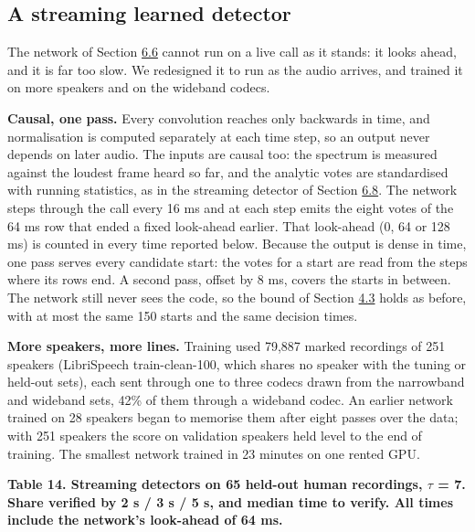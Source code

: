 \documentclass[10pt,a4paper]{article}
\begin{document}
\subsection{A streaming learned detector}\label{s-6-13}

The network of Section \hyperref[s-6-6]{6.6} cannot run on a live call as it stands: it looks ahead, and it is far too slow. We redesigned it to run as the audio arrives, and trained it on more speakers and on the wideband codecs.

\textbf{Causal, one pass.} Every convolution reaches only backwards in time, and normalisation is computed separately at each time step, so an output never depends on later audio. The inputs are causal too: the spectrum is measured against the loudest frame heard so far, and the analytic votes are standardised with running statistics, as in the streaming detector of Section \hyperref[s-6-8]{6.8}. The network steps through the call every 16 ms and at each step emits the eight votes of the 64 ms row that ended a fixed look-ahead earlier. That look-ahead (0, 64 or 128 ms) is counted in every time reported below. Because the output is dense in time, one pass serves every candidate start: the votes for a start are read from the steps where its rows end. A second pass, offset by 8 ms, covers the starts in between. The network still never sees the code, so the bound of Section \hyperref[s-4-3]{4.3} holds as before, with at most the same 150 starts and the same decision times.

\textbf{More speakers, more lines.} Training used 79,887 marked recordings of 251 speakers (LibriSpeech train-clean-100, which shares no speaker with the tuning or held-out sets), each sent through one to three codecs drawn from the narrowband and wideband sets, 42\% of them through a wideband codec. An earlier network trained on 28 speakers began to memorise them after eight passes over the data; with 251 speakers the score on validation speakers held level to the end of training. The smallest network trained in 23 minutes on one rented GPU.

\begin{center}\small {}\label{t-14}\textbf{Table 14. Streaming detectors on 65 held-out human recordings, $\tau$ = 7. Share verified by 2 s / 3 s / 5 s, and median time to verify. All times include the network's look-ahead of 64 ms.}\end{center}
\end{document}
